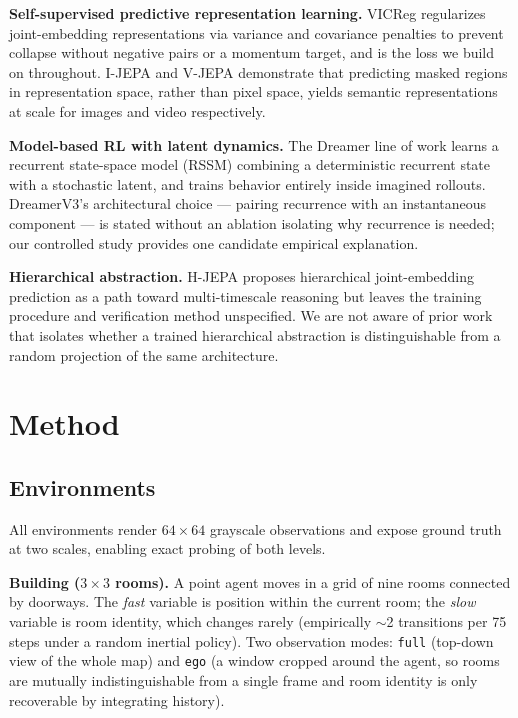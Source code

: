 \documentclass[11pt]{article}
\begin{document}
\textbf{Self-supervised predictive representation learning.} VICReg \citep{bardes2021vicreg} regularizes joint-embedding representations via variance and covariance penalties to prevent collapse without negative pairs or a momentum target, and is the loss we build on throughout. I-JEPA \citep{assran2023ijepa} and V-JEPA \citep{bardes2024vjepa} demonstrate that predicting masked regions in representation space, rather than pixel space, yields semantic representations at scale for images and video respectively.

\textbf{Model-based RL with latent dynamics.} The Dreamer line of work \citep{hafner2023dreamerv3} learns a recurrent state-space model (RSSM) combining a deterministic recurrent state with a stochastic latent, and trains behavior entirely inside imagined rollouts. DreamerV3's architectural choice --- pairing recurrence with an instantaneous component --- is stated without an ablation isolating why recurrence is needed; our controlled study provides one candidate empirical explanation.

\textbf{Hierarchical abstraction.} H-JEPA \citep{lecun2022path} proposes hierarchical joint-embedding prediction as a path toward multi-timescale reasoning but leaves the training procedure and verification method unspecified. We are not aware of prior work that isolates whether a trained hierarchical abstraction is distinguishable from a random projection of the same architecture.

\section{Method}

\subsection{Environments}

All environments render $64\times64$ grayscale observations and expose ground truth at two scales, enabling exact probing of both levels.

\textbf{Building ($3\times3$ rooms).} A point agent moves in a grid of nine rooms connected by doorways. The \emph{fast} variable is position within the current room; the \emph{slow} variable is room identity, which changes rarely (empirically $\sim$2 transitions per 75 steps under a random inertial policy). Two observation modes: \texttt{full} (top-down view of the whole map) and \texttt{ego} (a window cropped around the agent, so rooms are mutually indistinguishable from a single frame and room identity is only recoverable by integrating history).
\end{document}
